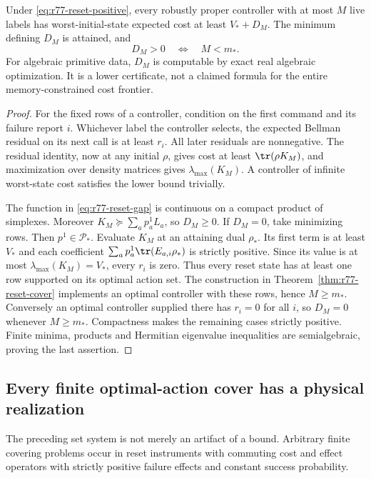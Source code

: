 \begin{theorem}
\label{thm:r77-reset-gap}
Under \eqref{eq:r77-reset-positive}, every robustly proper controller
with at most $M$ live labels has worst-initial-state expected cost at
least $V_*+D_M$.  The minimum defining $D_M$ is attained, and
\[
 D_M>0\quad\Longleftrightarrow\quad M<m_*.
\]
For algebraic primitive data, $D_M$ is computable by exact real
algebraic optimization.  It is a lower certificate, not a claimed
formula for the entire memory-constrained cost frontier.
\end{theorem}
\begin{proof}
For the fixed rows of a controller, condition on the first command and
its failure report $i$.  Whichever label the controller selects, the
expected Bellman residual on its next call is at least $r_i$.  All
later residuals are nonnegative.  The residual identity, now at any
initial $\rho$, gives cost at least $\tr(\rho K_M)$, and maximization
over density matrices gives $\lambda_{\max}(K_M)$.  A controller of
infinite worst-state cost satisfies the lower bound trivially.

The function in \eqref{eq:r77-reset-gap} is continuous on a compact
product of simplexes.  Moreover $K_M\succeq\sum_a p^1_aL_a$, so
$D_M\ge0$.  If $D_M=0$, take minimizing rows.  Then $p^1\in\mathcal
P_*$.  Evaluate $K_M$ at an attaining dual $\rho_*$.  Its first term
is at least $V_*$ and each coefficient
$\sum_a p^1_a\tr(E_{a,i}\rho_*)$ is strictly positive.  Since its
value is at most $\lambda_{\max}(K_M)=V_*$, every $r_i$ is zero.
Thus every reset state has at least one row supported on its optimal
action set.  The construction in Theorem~\ref{thm:r77-reset-cover}
implements an optimal controller with these rows, hence $M\ge m_*$.
Conversely an optimal controller supplied there has $r_i=0$ for all
$i$, so $D_M=0$ whenever $M\ge m_*$.  Compactness makes the remaining
cases strictly positive.  Finite minima, products and Hermitian
eigenvalue inequalities are semialgebraic, proving the last assertion.
\end{proof}

\subsection{Every finite optimal-action cover has a physical realization}

The preceding set system is not merely an artifact of a bound.
Arbitrary finite covering problems occur in reset instruments with
commuting cost and effect operators
with strictly positive failure effects and constant success probability.

